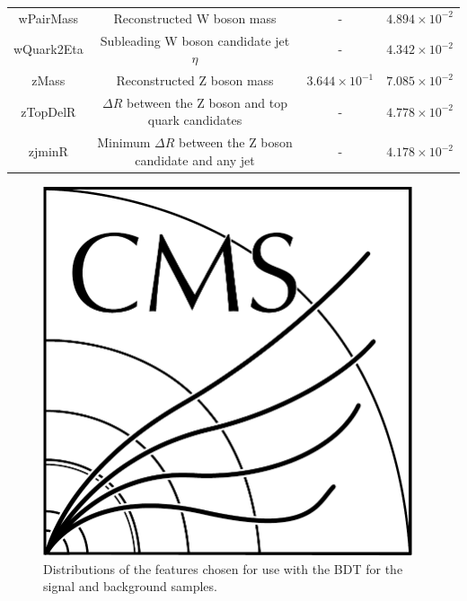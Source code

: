 \begin{table}[htbp]
{\begin{tabular}{cccc}
    wPairMass & Reconstructed W boson mass & -  & $4.894 \times 10^{-2}$  \\
    wQuark2Eta & Subleading W boson candidate jet $\eta$ & - & $4.342 \times 10^{-2}$ \\
    zMass & Reconstructed Z boson mass & $3.644 \times 10^{-1}$  & $7.085 \times 10^{-2}$  \\
    zTopDelR & $\Delta R$ between the Z boson and top quark candidates & - & $4.778 \times 10^{-2}$ \\
    zjminR & Minimum $\Delta R$ between the Z boson candidate and any jet & - & $4.178 \times 10^{-2}$ \\
   \hline
 \end{tabular}}
\end{table}

\begin{figure}[tbp]
\centering
\includegraphics[width=0.97\textwidth]{CMS-bw-logo.pdf}
\caption{
Distributions of the features chosen for use with the BDT for the signal and background samples.}
\label{fig:inputFeaturesDistributions}
\end{figure}

